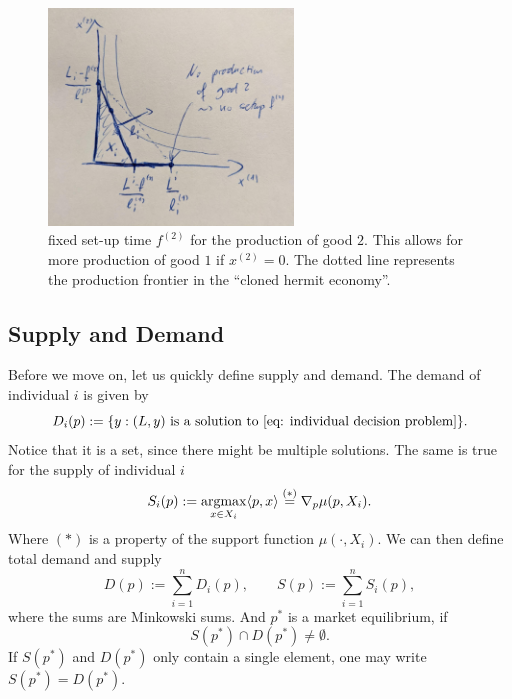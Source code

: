 \begin{example*}

\end{example*}

\begin{figure}
	\includegraphics[width=0.58\textwidth]{images/hermit-decision-setup-cost.jpeg}
	\caption{
	fixed set-up time \(f^{(2)}\) for the production of good \(2\). This allows
	for more production of good \(1\) if \(x^{(2)}=0\). The dotted line
	represents the production frontier in the ``cloned hermit economy''.}
\end{figure}

\subsection{Supply and Demand}

Before we move on, let us quickly define supply and demand. The demand of
individual \(i\) is given by
\[
	D_i(p) := \{
		y : (L,y)
		\text{ is a solution to \eqref{eq: individual decision problem}}
	\}.
\]
Notice that it is a set, since there might be multiple solutions. The same is
true for the supply of individual \(i\)
\[
	S_i(p) := \operatorname*{argmax}_{x\in X_i} \langle p, x\rangle 
	\overset{(*)}= \nabla_p \mu(p, X_i).
\]
Where \((*)\) is a property of the support function \(\mu(\cdot,
X_i)\).
We can then define total demand and supply
\[
	D(p) := \sum_{i=1}^n D_i(p),
	\qquad
	S(p) := \sum_{i=1}^n S_i(p),
\]
where the sums are Minkowski sums.
And \(p^*\) is a market equilibrium, if
\[
	S(p^*)\cap D(p^*)\neq\emptyset.
\]
If \(S(p^*)\) and \(D(p^*)\) only contain a single element, one may write
\(S(p^*)=D(p^*)\).